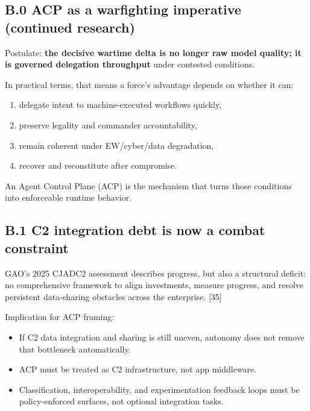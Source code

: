 \documentclass[
]{article}
\providecommand{\tightlist}{%
  \setlength{\itemsep}{0pt}\setlength{\parskip}{0pt}}
\begin{document}
\hypertarget{b.0-acp-as-a-warfighting-imperative-continued-research}{%
\subsection{B.0 ACP as a warfighting imperative (continued
research)}\label{b.0-acp-as-a-warfighting-imperative-continued-research}}

Postulate: \textbf{the decisive wartime delta is no longer raw model
quality; it is governed delegation throughput} under contested
conditions.

In practical terms, that means a force's advantage depends on whether it
can:

\begin{enumerate}
\def\labelenumi{\arabic{enumi}.}
\tightlist
\item
  delegate intent to machine-executed workflows quickly,
\item
  preserve legality and commander accountability,
\item
  remain coherent under EW/cyber/data degradation,
\item
  recover and reconstitute after compromise.
\end{enumerate}

An Agent Control Plane (ACP) is the mechanism that turns those
conditions into enforceable runtime behavior.

\hypertarget{b.1-c2-integration-debt-is-now-a-combat-constraint}{%
\subsection{B.1 C2 integration debt is now a combat
constraint}\label{b.1-c2-integration-debt-is-now-a-combat-constraint}}

GAO's 2025 CJADC2 assessment describes progress, but also a structural
deficit: no comprehensive framework to align investments, measure
progress, and resolve persistent data-sharing obstacles across the
enterprise. {[}35{]}

Implication for ACP framing:

\begin{itemize}
\tightlist
\item
  If C2 data integration and sharing is still uneven, autonomy does not
  remove that bottleneck automatically.
\item
  ACP must be treated as C2 infrastructure, not app middleware.
\item
  Classification, interoperability, and experimentation feedback loops
  must be policy-enforced surfaces, not optional integration tasks.
\end{itemize}
\end{document}
